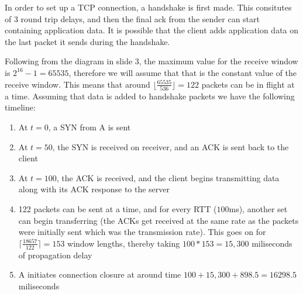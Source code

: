 \documentclass[12pt]{article}
\begin{document}
In order to set up a TCP connection, a handshake is first made.  This consitutes
of 3 round trip delays, and then the final ack from the sender can start
containing application data.  It is possible that the client adds application
data on the last packet it sends during the handshake.

Following from the diagram in slide 3, the maximum value for the receive
window is $2^{16} - 1 = 65535$, therefore we will assume that that is the
constant value of the receive window.  This means that around $\lfloor
\frac{65535}{536} \rfloor = 122$ packets can be in flight at a time.  Assuming
that data is added to handshake packets we have the following timeline:

\begin{enumerate}
   \item At $t = 0$, a SYN from A is sent
   \item At $t = 50$, the SYN is received on receiver, and an ACK is sent
      back to the client
   \item At $t = 100$, the ACK is received, and the client begins transmitting
      data along with its ACK response to the server
   \item 122 packets can be sent at a time, and for every RTT ($100$ms), another
      set can begin transferring (the ACKs get received at the same rate as the
      packets were initially sent which was the transmission rate).  This goes
      on for $\lceil \frac{18657}{122} \rceil = 153$ window lengths, thereby
      taking $100 * 153 = 15,300$ miliseconds of propagation delay
   \item A initiates connection closure at around time $100 + 15,300 + 898.5 =
      16298.5$ miliseconds
\end{enumerate}
\end{document}
